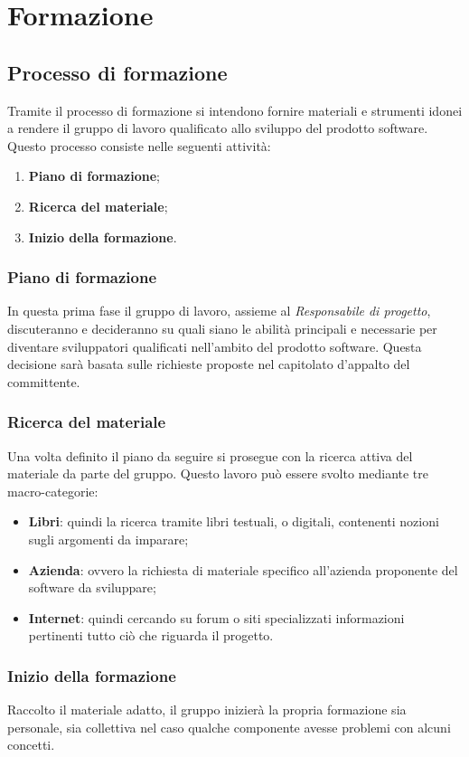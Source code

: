 \chapter{Formazione}\label{Formazione}
\section{Processo di formazione}\label{FormazioneProcessoDiFormazione}
Tramite il processo di formazione si intendono fornire materiali e strumenti idonei a rendere il gruppo di lavoro qualificato allo sviluppo del prodotto software.
Questo processo consiste nelle seguenti attività:
\begin{enumerate}
	\item \textbf{Piano di formazione};
	\item \textbf{Ricerca del materiale};
	\item \textbf{Inizio della formazione}.
\end{enumerate}
\subsection{Piano di formazione}\label{FormazioneProcessoDiFormazionePianoDiFormazione}
In questa prima fase il gruppo di lavoro, assieme al \textit{Responsabile di progetto}, discuteranno e decideranno su quali siano le abilità principali e necessarie per diventare sviluppatori qualificati nell'ambito del prodotto software.
Questa decisione sarà basata sulle richieste proposte nel capitolato d'appalto del committente.
\subsection{Ricerca del materiale}\label{FormazioneProcessoDiFormazioneRicercaDelMateriale}
Una volta definito il piano da seguire si prosegue con la ricerca attiva del materiale da parte del gruppo.
Questo lavoro può essere svolto mediante tre macro-categorie:
\begin{itemize}
	\item \textbf{Libri}: quindi la ricerca tramite libri testuali, o digitali, contenenti nozioni sugli argomenti da imparare;
	\item \textbf{Azienda}: ovvero la richiesta di materiale specifico all'azienda proponente del software da sviluppare;
	\item \textbf{Internet}: quindi cercando su forum o siti specializzati informazioni pertinenti tutto ciò che riguarda il progetto.
\end{itemize}
\subsection{Inizio della formazione}\label{FormazioneProcessoDiFormazioneInizioDellaFormazione}
Raccolto il materiale adatto, il gruppo inizierà la propria formazione sia personale, sia collettiva nel caso qualche componente avesse problemi con alcuni concetti.
